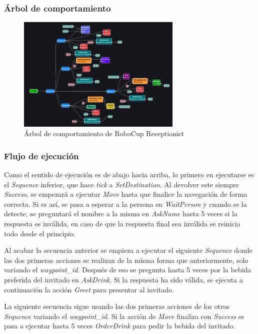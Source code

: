 \subsubsection{Árbol de comportamiento}
\begin{figure}[H]
    \centering
    \includegraphics[width=0.7\textwidth]{figures/validation/Receptionist_1.png}
    \caption{Árbol de comportamiento de RoboCup Receptionist}
    \label{fig:ejemplo}
\end{figure}

\subsubsection{Flujo de ejecución}

Como el sentido de ejecución es de abajo hacia arriba, lo primero en ejecutarse es el \textit{Sequence} inferior, que hace \textit{tick} a \textit{SetDestination}. Al devolver este siempre \textit{Success}, se empezará a ejecutar \textit{Move} hasta que finalice la navegación de forma correcta. Si es así, se pasa a esperar a la persona en \textit{WaitPerson} y cuando se la detecte, se preguntará el nombre a la misma en \textit{AskName} hasta 5 veces si la respuesta es inválida, en caso de que la respuesta final sea inválida se reinicia todo desde el principio.

Al acabar la secuencia anterior se empieza a ejecutar el siguiente \textit{Sequence} donde las dos primeras acciones se realizan de la misma forma que anteriormente, solo variando el \textit{waypoint\_id}. Después de eso se pregunta hasta 5 veces por la bebida preferida del invitado en \textit{AskDrink}. Si la respuesta ha sido válida, se ejecuta a continuación la acción \textit{Greet} para presentar al invitado. 

La siguiente secuencia sigue usando las dos primeras acciones de los otros \textit{Sequence} variando el \textit{waypoint\_id}. Si la acción de \textit{Move} finaliza con \textit{Success} se pasa a ejecutar hasta 5 veces \textit{OrderDrink} para pedir la bebida del invitado.

